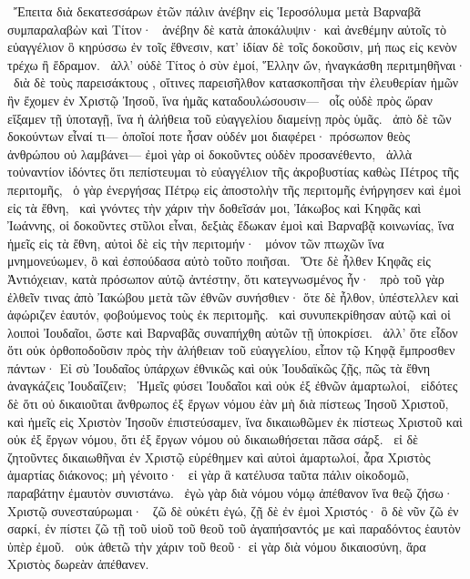 ~Ἔπειτα διὰ δεκατεσσάρων ἐτῶν πάλιν ἀνέβην εἰς Ἱεροσόλυμα μετὰ Βαρναβᾶ συμπαραλαβὼν καὶ Τίτον·
~ἀνέβην δὲ κατὰ ἀποκάλυψιν· καὶ ἀνεθέμην αὐτοῖς τὸ εὐαγγέλιον ὃ κηρύσσω ἐν τοῖς ἔθνεσιν, κατ’ ἰδίαν δὲ τοῖς δοκοῦσιν, μή πως εἰς κενὸν τρέχω ἢ ἔδραμον.
~ἀλλ’ οὐδὲ Τίτος ὁ σὺν ἐμοί, Ἕλλην ὤν, ἠναγκάσθη περιτμηθῆναι·
~διὰ δὲ τοὺς παρεισάκτους , οἵτινες παρεισῆλθον κατασκοπῆσαι τὴν ἐλευθερίαν ἡμῶν ἣν ἔχομεν ἐν Χριστῷ Ἰησοῦ, ἵνα ἡμᾶς καταδουλώσουσιν—
~οἷς οὐδὲ πρὸς ὥραν εἴξαμεν τῇ ὑποταγῇ, ἵνα ἡ ἀλήθεια τοῦ εὐαγγελίου διαμείνῃ πρὸς ὑμᾶς.
~ἀπὸ δὲ τῶν δοκούντων εἶναί τι— ὁποῖοί ποτε ἦσαν οὐδέν μοι διαφέρει· πρόσωπον θεὸς ἀνθρώπου οὐ λαμβάνει— ἐμοὶ γὰρ οἱ δοκοῦντες οὐδὲν προσανέθεντο,
~ἀλλὰ τοὐναντίον ἰδόντες ὅτι πεπίστευμαι τὸ εὐαγγέλιον τῆς ἀκροβυστίας καθὼς Πέτρος τῆς περιτομῆς,
~ὁ γὰρ ἐνεργήσας Πέτρῳ εἰς ἀποστολὴν τῆς περιτομῆς ἐνήργησεν καὶ ἐμοὶ εἰς τὰ ἔθνη,
~καὶ γνόντες τὴν χάριν τὴν δοθεῖσάν μοι, Ἰάκωβος καὶ Κηφᾶς καὶ Ἰωάννης, οἱ δοκοῦντες στῦλοι εἶναι, δεξιὰς ἔδωκαν ἐμοὶ καὶ Βαρναβᾷ κοινωνίας, ἵνα ἡμεῖς εἰς τὰ ἔθνη, αὐτοὶ δὲ εἰς τὴν περιτομήν·
~μόνον τῶν πτωχῶν ἵνα μνημονεύωμεν, ὃ καὶ ἐσπούδασα αὐτὸ τοῦτο ποιῆσαι.
~Ὅτε δὲ ἦλθεν Κηφᾶς εἰς Ἀντιόχειαν, κατὰ πρόσωπον αὐτῷ ἀντέστην, ὅτι κατεγνωσμένος ἦν·
~πρὸ τοῦ γὰρ ἐλθεῖν τινας ἀπὸ Ἰακώβου μετὰ τῶν ἐθνῶν συνήσθιεν· ὅτε δὲ ἦλθον, ὑπέστελλεν καὶ ἀφώριζεν ἑαυτόν, φοβούμενος τοὺς ἐκ περιτομῆς.
~καὶ συνυπεκρίθησαν αὐτῷ καὶ οἱ λοιποὶ Ἰουδαῖοι, ὥστε καὶ Βαρναβᾶς συναπήχθη αὐτῶν τῇ ὑποκρίσει.
~ἀλλ’ ὅτε εἶδον ὅτι οὐκ ὀρθοποδοῦσιν πρὸς τὴν ἀλήθειαν τοῦ εὐαγγελίου, εἶπον τῷ Κηφᾷ ἔμπροσθεν πάντων· Εἰ σὺ Ἰουδαῖος ὑπάρχων ἐθνικῶς καὶ οὐκ Ἰουδαϊκῶς ζῇς, πῶς τὰ ἔθνη ἀναγκάζεις Ἰουδαΐζειν;
~Ἡμεῖς φύσει Ἰουδαῖοι καὶ οὐκ ἐξ ἐθνῶν ἁμαρτωλοί,
~εἰδότες δὲ ὅτι οὐ δικαιοῦται ἄνθρωπος ἐξ ἔργων νόμου ἐὰν μὴ διὰ πίστεως Ἰησοῦ Χριστοῦ, καὶ ἡμεῖς εἰς Χριστὸν Ἰησοῦν ἐπιστεύσαμεν, ἵνα δικαιωθῶμεν ἐκ πίστεως Χριστοῦ καὶ οὐκ ἐξ ἔργων νόμου, ὅτι ἐξ ἔργων νόμου οὐ δικαιωθήσεται πᾶσα σάρξ.
~εἰ δὲ ζητοῦντες δικαιωθῆναι ἐν Χριστῷ εὑρέθημεν καὶ αὐτοὶ ἁμαρτωλοί, ἆρα Χριστὸς ἁμαρτίας διάκονος; μὴ γένοιτο·
~εἰ γὰρ ἃ κατέλυσα ταῦτα πάλιν οἰκοδομῶ, παραβάτην ἐμαυτὸν συνιστάνω.
~ἐγὼ γὰρ διὰ νόμου νόμῳ ἀπέθανον ἵνα θεῷ ζήσω· Χριστῷ συνεσταύρωμαι·
~ζῶ δὲ οὐκέτι ἐγώ, ζῇ δὲ ἐν ἐμοὶ Χριστός· ὃ δὲ νῦν ζῶ ἐν σαρκί, ἐν πίστει ζῶ τῇ τοῦ υἱοῦ τοῦ θεοῦ τοῦ ἀγαπήσαντός με καὶ παραδόντος ἑαυτὸν ὑπὲρ ἐμοῦ.
~οὐκ ἀθετῶ τὴν χάριν τοῦ θεοῦ· εἰ γὰρ διὰ νόμου δικαιοσύνη, ἄρα Χριστὸς δωρεὰν ἀπέθανεν.

